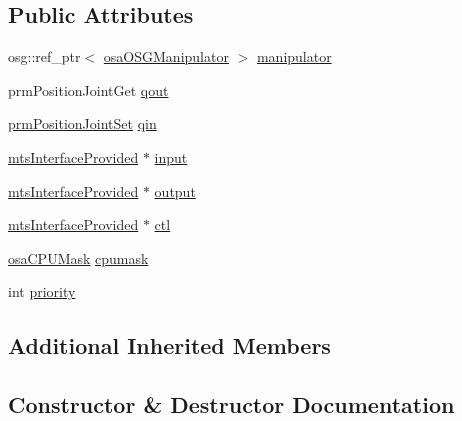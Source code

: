 \subsection*{Public Attributes}
\begin{DoxyCompactItemize}
\item 
osg\+::ref\+\_\+ptr$<$ \hyperlink{classosa_o_s_g_manipulator}{osa\+O\+S\+G\+Manipulator} $>$ \hyperlink{classmts_o_d_e_manipulator_task_af71c105f986e50bd23dd3a385bbf73d4}{manipulator}
\item 
prm\+Position\+Joint\+Get \hyperlink{classmts_o_d_e_manipulator_task_a162ca16e37ce8838ff2214b8b33f4b84}{qout}
\item 
\hyperlink{classprm_position_joint_set}{prm\+Position\+Joint\+Set} \hyperlink{classmts_o_d_e_manipulator_task_a07c031b24bcc9abafd6b00f1f8353a39}{qin}
\item 
\hyperlink{classmts_interface_provided}{mts\+Interface\+Provided} $\ast$ \hyperlink{classmts_o_d_e_manipulator_task_ad765a99ba781dadce40237760b2ea115}{input}
\item 
\hyperlink{classmts_interface_provided}{mts\+Interface\+Provided} $\ast$ \hyperlink{classmts_o_d_e_manipulator_task_a73b391727790f249e975cb84a385f753}{output}
\item 
\hyperlink{classmts_interface_provided}{mts\+Interface\+Provided} $\ast$ \hyperlink{classmts_o_d_e_manipulator_task_adc6a0ee6337d56ed19e8dddf86586498}{ctl}
\item 
\hyperlink{osa_c_p_u_affinity_8h_aaec7cdd7797e5e6eb5438c15fee5477a}{osa\+C\+P\+U\+Mask} \hyperlink{classmts_o_d_e_manipulator_task_aaff55dbeff38e947707c6b3405041622}{cpumask}
\item 
int \hyperlink{classmts_o_d_e_manipulator_task_ae2b16e466e4d216b2cf13ae89414696a}{priority}
\end{DoxyCompactItemize}
\subsection*{Additional Inherited Members}


\subsection{Constructor \& Destructor Documentation}
\hypertarget{classmts_o_d_e_manipulator_task_a96f32aa849ef22dda77166d79d7b0839}{}
